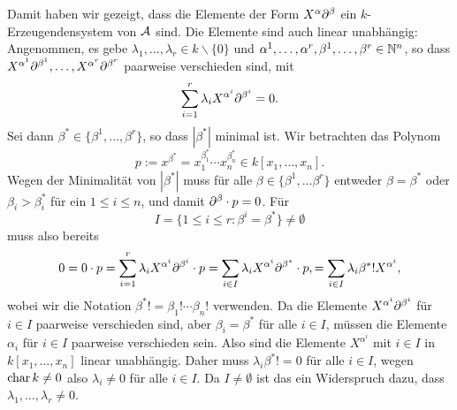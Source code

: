 \documentclass[a4paper,10pt]{article}
\begin{document}
Damit haben wir gezeigt, dass die Elemente der Form $X^\alpha \partial^\beta$ ein $k$-Erzeu\-gen\-den\-sys\-tem von $\mathcal{A}$ sind. Die Elemente sind auch linear unabhängig: Angenommen, es gebe $\lambda_1, \ldots, \lambda_r \in k \smallsetminus \{0\}$ und $\alpha^1, \ldots, \alpha^r, \beta^1, \ldots, \beta^r \in \mathbb{N}^n$, so dass $X^{\alpha^1} \partial^{\beta^1}, \ldots, X^{\alpha^r} \partial^{\beta^r}$ paarweise verschieden sind, mit 
\[
 \sum_{i=1}^r \lambda_i X^{\alpha^i} \partial^{\beta^i} = 0.
\]
Sei dann $\beta^* \in \{\beta^1, \ldots, \beta^r\}$, so dass $|\beta^*|$ minimal ist. Wir betrachten das Polynom
\[
 p := x^{\beta^*} = x_1^{\beta^*_1} \cdots x_n^{\beta^*_n} \in k[x_1, \ldots, x_n].
\]
Wegen der Minimalität von $|\beta^*|$ muss für alle $\beta \in \{\beta^1, \ldots \beta^r\}$ entweder $\beta = \beta^*$ oder $\beta_i > \beta^*_i$ für ein $1 \leq i \leq n$, und damit $\partial^\beta \cdot p = 0$. Für
\[
 I = \{1 \leq i \leq r : \beta^i = \beta^*\} \neq \emptyset
\]
muss also bereits
\[
 0
 = 0 \cdot p
 = \sum_{i=1}^r \lambda_i X^{\alpha^i} \partial^{\beta^i} \cdot p
 = \sum_{i \in I} \lambda_i X^{\alpha^i} \partial^{\beta^*} \cdot p,
 = \sum_{i \in I} \lambda_i \beta^*! X^{\alpha^i},
\]
wobei wir die Notation $\beta^*! = \beta_1! \cdots \beta_n!$ verwenden. Da die Elemente $X^{\alpha^i} \partial^{\beta^i}$ für $i \in I$ paarweise verschieden sind, aber $\beta_i = \beta^*$ für alle $i \in I$, müssen die Elemente $\alpha_i$ für $i \in I$ paarweise verschieden sein. Also sind die Elemente $X^{\alpha^i}$ mit $i \in I$ in $k[x_1, \ldots, x_n]$ linear unabhängig. Daher muss $\lambda_i \beta^*! = 0$ für alle $i \in I$, wegen $\operatorname{char} k \neq 0$ also $\lambda_i \neq 0$ für alle $i \in I$. Da $I \neq \emptyset$ ist das ein Widerspruch dazu, dass $\lambda_1, \ldots, \lambda_r \neq 0$.
\end{document}
